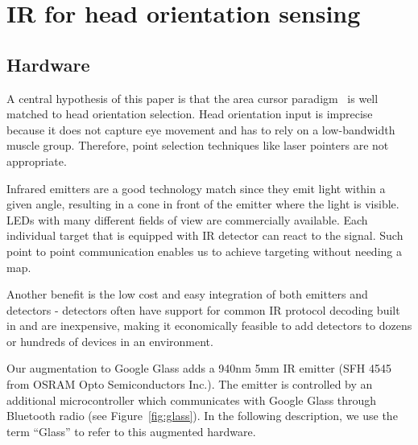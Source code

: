 \section{IR for head orientation sensing}

\subsection{Hardware}
A central hypothesis of this paper is that the area cursor paradigm~\cite{kabbash1995prince} is well matched to head orientation selection. Head orientation input is imprecise because it does not capture eye movement and has to rely on a low-bandwidth muscle group. Therefore, point selection techniques like laser pointers are not appropriate. 

Infrared emitters are a good technology match since they emit light within a given angle, resulting in a cone in front of the emitter where the light is visible. LEDs with many different fields of view are commercially available. Each individual target that is equipped with IR detector can react to the signal. Such point to point communication enables us to achieve targeting without needing a map.

Another benefit is the low cost and easy integration of both emitters and detectors - detectors often have support for common IR protocol decoding built in and are inexpensive, making it economically feasible to add detectors to dozens or hundreds of devices in an environment.

Our augmentation to Google Glass adds a 940nm 5mm IR emitter (SFH 4545 from OSRAM Opto Semiconductors Inc.). The emitter is controlled by an additional microcontroller which communicates with Google Glass through Bluetooth radio (see Figure~\ref{fig:glass}). In the following description, we use the term ``Glass'' to refer to this augmented hardware.


